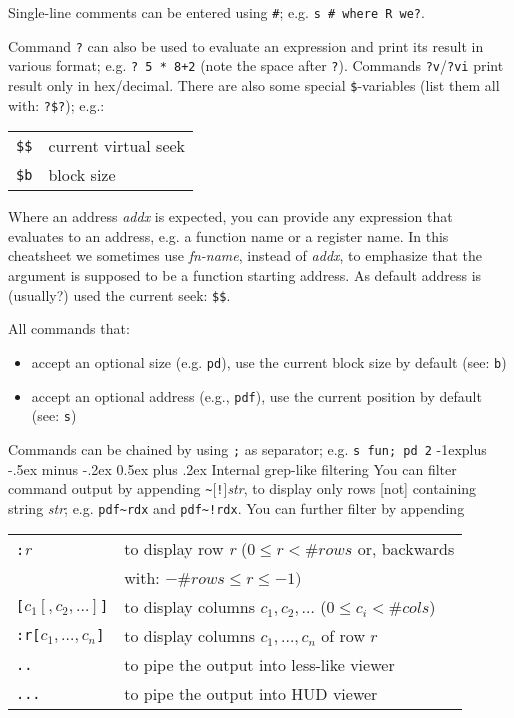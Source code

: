 \documentclass[a4paper,landscape]{article}
\makeatletter
\renewcommand{\subsection}{\@startsection{subsection}{2}{0mm}%
                                {-1explus -.5ex minus -.2ex}%
                                {0.5ex plus .2ex}%
                                {\normalfont\normalsize\bfseries}}
\makeatother
\begin{document}
\begin{multicols*}{3}
Single-line comments can be entered using \texttt{\#}; e.g. \texttt{s \# where R we?}.

Command \texttt{?} can also be used to evaluate an expression and print its result in various format; e.g. \texttt{? 5 * 8+2} (note the space after \texttt{?}). Commands \texttt{?v}/\texttt{?vi} print result only in hex/decimal. There are also some special \texttt{\$}-variables
(list them all with: \texttt{?\$?}); e.g.:

\begin{tabular}{@{}ll@{}}
\texttt{\$\$} & current virtual seek \\
\texttt{\$b} & 	block size \\
\end{tabular}

Where an address \textit{addx} is expected, you can provide any expression that evaluates to an address,
e.g. a function name or a register name. In this cheatsheet we sometimes use \textit{fn-name}, instead of \textit{addx}, to emphasize that the argument is supposed to be a function starting address. As default address is (usually?) used the current seek: \texttt{\$\$}.

All commands that:
\begin{itemize}
\item accept an optional size (e.g. \texttt{pd}), use the current block size by default (see: \texttt{b})
\item accept an optional address (e.g., \texttt{pdf}), use the current position by default (see: \texttt{s})
\end{itemize}
Commands can be chained by using \texttt{;} as separator; e.g. \texttt{s fun; pd 2}
\subsection{Internal grep-like filtering}
You can filter command output by appending \texttt{\textasciitilde{}}[\texttt{!}]\textit{str}, to display only rows [not] containing string \textit{str}; e.g. \texttt{pdf\textasciitilde{}rdx} and \texttt{pdf\textasciitilde{}!rdx}. You can further filter by appending

\begin{tabular}{@{}ll@{}}
\texttt{:}\textit{r}	& to display row \textit{r} ($0\le r < \#\mathit{rows}$ or, backwards \\ & with: $-\#\mathit{rows}\le r \le -1)$ \\
\texttt{[}$c_1[,c_2,\ldots]$\texttt{]}	& to display columns $c_1,c_2,\ldots$ ($0\le c_i < \#\mathit{cols}$) \\
\texttt{:r[}$c_1,\ldots,c_n$\texttt{]}	& to display columns $c_1,\ldots,c_n$ of row $r$ \\
\texttt{..} & to pipe the output into less-like viewer \\
\texttt{...} & to pipe the output into HUD viewer \\
\end{tabular}


\end{multicols*}
\end{document}
